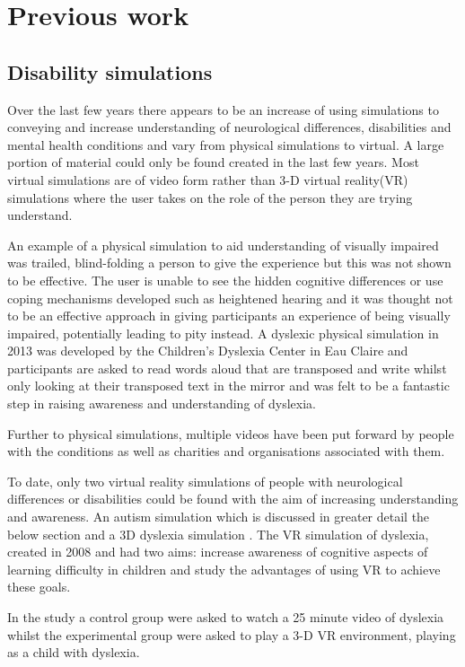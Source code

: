 \documentclass[11pt]{report}
\begin{document}
\section{Previous work}

\subsection{Disability simulations}
Over the last few years there appears to be an increase of using simulations to conveying and increase understanding of neurological differences, disabilities and mental health conditions and vary from physical simulations to virtual. A large portion of material could only be found created in the last few years. Most virtual simulations are of video form rather than 3-D virtual reality(VR) simulations where the user takes on the role of the person they are trying understand.  

An example of a physical simulation to aid understanding of visually impaired was trailed, blind-folding a person to give the experience but this was not shown to be effective\cite{dd}. The user is unable to see the hidden cognitive differences or use coping mechanisms developed such as heightened hearing and it was thought not to be an effective approach in giving participants an experience of being visually impaired, potentially leading to pity instead\cite{dd}. A dyslexic physical simulation in 2013 was developed by the Children’s Dyslexia Center in Eau Claire and participants are asked to read words aloud that are transposed and write whilst only looking at their transposed text in the mirror\cite{udyslexia} and was felt to be a fantastic step in raising awareness and understanding of dyslexia. 

Further to physical simulations, multiple videos have been put forward by people with the conditions as well as charities and organisations associated with them. 

To date, only two virtual reality simulations of people with neurological differences or disabilities could be found with the aim of increasing understanding and awareness. An autism simulation which is discussed in greater detail the below section and a 3D dyslexia simulation \cite{dyslexicsimpar}. The VR simulation of dyslexia, created in 2008 and had two aims: increase awareness of cognitive aspects of learning difficulty in children and study the advantages of using VR to achieve these goals. 

In the study\cite{dyslexicsimpar} a control group were asked to watch a 25 minute video of dyslexia whilst the experimental group were asked to play a 3-D VR environment, playing as a child with dyslexia.
\end{document}
